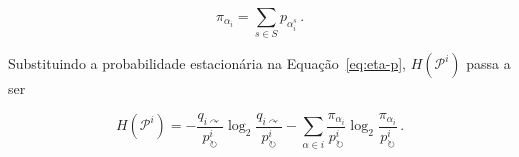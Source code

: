 \documentclass[
  article,
  11pt,
  a4paper,
  english,
  brazil,
  sumario=tradicional]{abntex2}
\begin{document}
\begin{equation*} \label{eq:page-rank-multilayer}
\pi_{\alpha_i} = \sum_{s \in S} p_{\alpha_i^s}\,.
\end{equation*}

Substituindo a probabilidade estacionária na Equação~\ref{eq:eta-p}, $H(\mathcal{P}^i)$ passa a ser

\begin{equation*}
H(\mathcal{P}^i) = - \frac{q_{i \curvearrowright}}{p^i_\circlearrowright} \log_2 \frac{q_{i \curvearrowright}}{p^i_\circlearrowright} 
-  \sum_{\alpha \in i} \frac{\pi_{\alpha_i}}{p^i_\circlearrowright} \log_2  \frac{\pi_{\alpha_i}}{p^i_\circlearrowright}\,.
\end{equation*}

\end{document}
